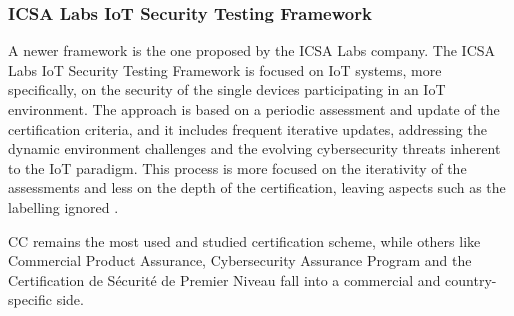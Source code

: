 \subsubsection{ICSA Labs IoT Security Testing Framework}
A newer framework is the one proposed by the ICSA Labs company. The ICSA Labs IoT Security Testing Framework is focused on IoT systems, more specifically, on the security of the single devices participating in an IoT environment. The approach is based on a periodic assessment and update of the certification criteria, and it includes frequent iterative updates, addressing the dynamic environment challenges and the evolving cybersecurity threats inherent to the IoT paradigm. This process is more focused on the iterativity of the assessments and less on the depth of the certification, leaving aspects such as the labelling ignored \cite{ICSAFw}.

CC remains the most used and studied certification scheme, while others like Commercial Product Assurance, Cybersecurity Assurance Program and the Certification de Sécurité de Premier Niveau fall into a commercial and country-specific side.


